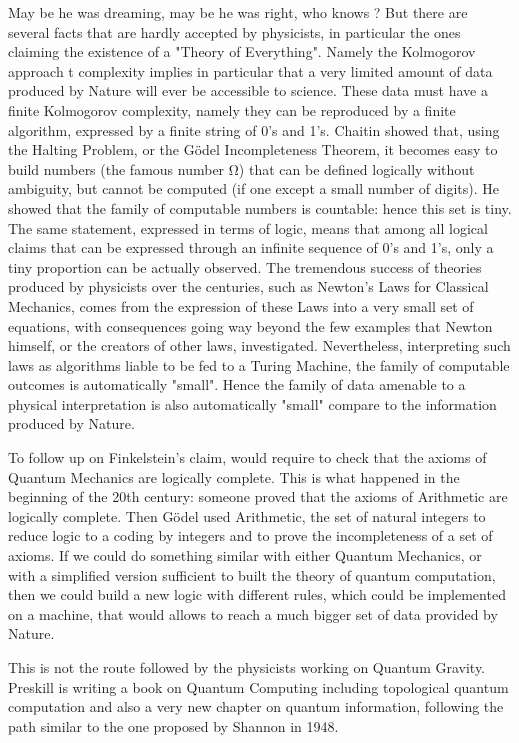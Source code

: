     May be he was dreaming, may be he was right, who knows ? But there are
    several facts that are hardly accepted by physicists, in particular the ones
    claiming the existence of a "Theory of Everything". Namely the Kolmogorov
    approach t complexity implies in particular that a very limited amount of
    data produced by Nature will ever be accessible to science. These data must
    have a finite Kolmogorov complexity, namely they can be reproduced by a
    finite algorithm, expressed by a finite string of 0's and 1's. Chaitin
    showed that, using the Halting Problem, or the G\"odel Incompleteness Theorem,
    it becomes easy to build numbers (the famous number Ω) that can be defined
    logically without ambiguity, but cannot be computed (if one except a small
    number of digits). He showed that the family of computable numbers is
    countable: hence this set is tiny. The same statement, expressed in terms of
    logic, means that among all logical claims that can be expressed through an
    infinite sequence of 0's and 1's, only a tiny proportion can be actually
    observed.  The tremendous success of theories produced by physicists over
    the centuries, such as Newton's Laws for Classical Mechanics, comes from the
    expression of these Laws into a very small set of equations, with
    consequences going way beyond the few examples that Newton himself, or the
    creators of other laws, investigated. Nevertheless, interpreting such laws
    as algorithms liable to be fed to a Turing Machine, the family of computable
    outcomes is automatically "small". Hence the family of data amenable to a
    physical interpretation is also automatically "small" compare to the
    information produced by Nature.


    To follow up on Finkelstein's claim, would require to check that the axioms of
    Quantum Mechanics are logically complete. This is what happened in the
    beginning of the 20th century: someone proved that the axioms of Arithmetic
    are logically complete. Then G\"odel used Arithmetic, the set of natural
    integers to reduce logic to a coding by integers and to prove the
    incompleteness of a set of axioms. If we could do something similar with
    either Quantum Mechanics, or with a simplified version sufficient to built
    the theory of quantum computation, then we could build a new logic with
    different rules, which could be implemented on a machine, that would allows
    to reach a much bigger set of data provided by Nature.


This is not the route followed by the physicists working on Quantum
Gravity.
{Preskill} is writing a book on Quantum Computing including topological
quantum computation and also a very new chapter on quantum information,
following the path similar to the one proposed by Shannon in 1948.

